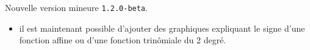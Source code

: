 Nouvelle version mineure \verb+1.2.0-beta+.

\begin{itemize}[itemsep=.5em]
    \item {}
          il est maintenant possible d'ajouter des graphiques expliquant le signe d'une fonction affine ou d'une fonction trinômiale du 2\ieme{} degré.
\end{itemize}